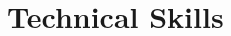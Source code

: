 \documentclass[a4paper,10pt]{article}
\begin{document}
\begin{adjustbox}{valign=t}
\begin{minipage}{0.3\textwidth}
\section*{Technical Skills}
\begin{description}
\raggedright
\item [\normalfont \textcolor{ColorOne}{OS}] 
	
\item [\normalfont \textcolor{ColorOne}{Programming languages}] 
\item [\normalfont \textcolor{ColorOne}{GitHub tools}] 
\item [\normalfont \textcolor{ColorOne}{Databases}] 
\end{description}

\end{minipage}
\end{adjustbox}
%
%
%
\hfill
\begin{adjustbox}{valign=t}
\begin{minipage}{0.05\textwidth} %
\MyVerticalRule  %
\end{minipage}
\end{adjustbox}
\hfill
%
\end{document}
